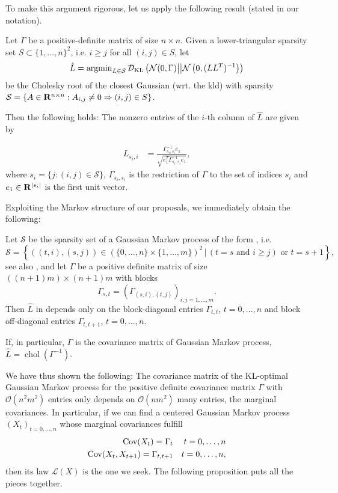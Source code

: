 To make this argument rigorous, let us apply the following result (stated in our notation).
\begin{theorem}
    \label{thm:schafer_cholesky_analytical}
    Let $\Gamma$ be a positive-definite matrix of size $n\times n$. Given a lower-triangular sparsity set $S \subset \{1, \dots, n\}^{2}$, i.e. $i \geq j$ for all $(i,j) \in S$, let 
    $$
    \hat L = \operatorname{argmin}_{L \in \mathcal S} \mathcal D_{\text{KL}} \left(\mathcal N (0, \Gamma) \middle|\middle| \mathcal N \left( 0, (LL^{T})^{-1} \right)\right)
    $$
    be the Cholesky root of the closest Gaussian (wrt. the \gls{kld}) with sparsity $\mathcal S = \{A \in \mathbf R^{n \times n}: A_{i,j} \neq 0 \Rightarrow (i,j) \in S\}$. 

    Then the following holds:
    The nonzero entries of the $i$-th column of $\hat L$ are given by 
    
    \begin{align}
    \label{eq:schafer_gamma}
        L_{s_{i}, i} &= \frac{\Gamma_{s_{i}, s_{i}}^{-1} e_{1}}{\sqrt{e_{1}^{T}\Gamma_{s_{i}, s_{i}}^{-1} e_{1}}},
    \end{align}
    where $s_{i} = \{j : (i,j) \in \mathcal S\}$, $\Gamma_{s_{i}, s_{i}}$ is the restriction of $\Gamma$ to the set of indices $s_{i}$ and $e_{1} \in\mathbf R^{\lvert s_{i}\rvert}$ is the first unit vector.
\end{theorem}
Exploiting the Markov structure of our proposals, we immediately obtain the following:
\begin{corollary}
    \label{cor:markov_sparsity}
    Let $\mathcal S$ be the sparsity set of a Gaussian Markov process of the form , i.e. 
    $$
        \mathcal S = \left\{ ((t,i),(s,j)) \in \left(\{0,\dots, n\}\times \{1,\dots, m\}\right)^{2} \,|\, (t = s \text{ and } i \geq  j) \text{ or } t = s + 1 \right\},
    $$
    see also ,
    and let $\Gamma$ be a positive definite matrix of size $((n+1)m)\times(n + 1)m$ with blocks
    $$
        \Gamma_{s,t} = (\Gamma_{(s,i),(t,j)})_{i,j =1,\dots,m}.
    $$
    Then $\hat L$ in  depends only on the block-diagonal entries $\Gamma_{t, t}$, $ t = 0, \dots, n$ and block off-diagonal entries $\Gamma_{t, t + 1}$, $t = 0, \dots, n$.

    If, in particular, $\Gamma$ is the covariance matrix of Gaussian Markov process, $\hat L = \operatorname{chol} (\Gamma ^{-1})$.
\end{corollary}

We have thus shown the following: The covariance matrix of the KL-optimal Gaussian Markov process for the positive definite covariance matrix $\Gamma$ with $\mathcal O(n^{2}m^{2})$ entries only depends on $\mathcal O(n m^{2})$ many entries, the marginal covariances. In particular, if we can find a centered Gaussian Markov process $(X_{t})_{t = 0, \dots, n}$ whose marginal covariances fulfill 
\begin{align*}
    \operatorname{Cov} (X_{t}) = \Gamma_{t}  && t = 0, \dots, n\\
    \operatorname{Cov} (X_{t}, X_{t + 1}) = \Gamma_{t, t + 1} && t = 0, \dots, n,
\end{align*}
then its law $\mathcal L (X)$ is the one we seek. The following proposition puts all the pieces together.

